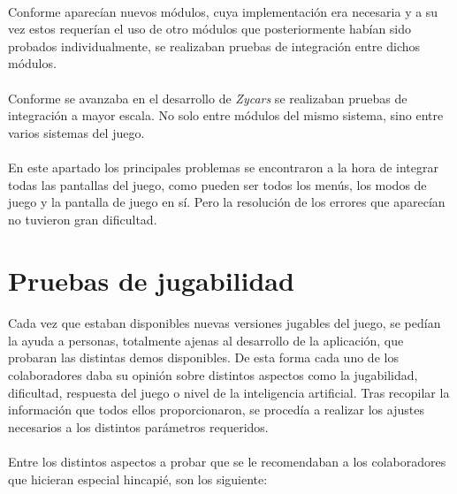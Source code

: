 \paragraph{}
Conforme aparecían nuevos módulos, cuya implementación era necesaria y a su vez estos requerían el uso de otro módulos que 
posteriormente habían sido probados individualmente, se realizaban pruebas de integración entre dichos módulos.

\paragraph{}
Conforme se avanzaba en el desarrollo de \emph{Zycars} se realizaban pruebas de integración a mayor escala. No solo entre módulos
del mismo sistema, sino entre varios sistemas del juego.

\paragraph{}
En este apartado los principales problemas se encontraron a la hora de integrar todas las pantallas del juego, como pueden ser todos
los menús, los modos de juego y la pantalla de juego en sí. Pero la resolución
de los errores que aparecían no tuvieron gran 
dificultad.

\section{Pruebas de jugabilidad}

\paragraph{}
Cada vez que estaban disponibles nuevas versiones jugables del juego, se pedían la ayuda a personas, totalmente ajenas al desarrollo
de la aplicación, que probaran las distintas demos disponibles. De esta forma cada uno de los colaboradores daba su opinión sobre
distintos aspectos como la jugabilidad, dificultad, respuesta del juego o nivel de la inteligencia artificial. Tras recopilar la
información que todos ellos proporcionaron, se procedía a realizar los ajustes
necesarios a los distintos parámetros requeridos.

\paragraph{}
Entre los distintos aspectos a probar que se le recomendaban a los
colaboradores que hicieran especial hincapié, son los siguiente:

